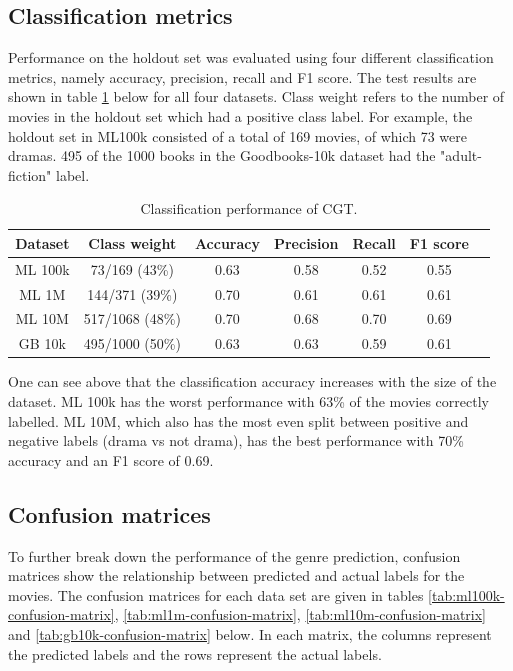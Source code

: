 \subsection{Classification metrics}
Performance on the holdout set was evaluated using four different classification metrics, namely accuracy, precision, recall and F1 score. The test results are shown in table \ref{tab:ml-test-results} below for all four datasets. Class weight refers to the number of movies in the holdout set which had a positive class label. For example, the holdout set in ML100k consisted of a total of 169 movies, of which 73 were dramas. 495 of the 1000 books in the Goodbooks-10k dataset had the "adult-fiction" label.

\begin{table}[H]
\centering
\begin{tabular}{c | c | c | c | c | c | c}
\toprule
\textbf{Dataset} & \textbf{Class weight} & \textbf{Accuracy} & \textbf{Precision} & \textbf{Recall} & \textbf{F1 score} \\
\midrule
ML 100k & 73/169 (43\%) & 0.63 & 0.58 & 0.52 & 0.55 \\
\midrule
ML 1M & 144/371 (39\%) & 0.70 & 0.61 & 0.61 & 0.61 \\
\midrule
ML 10M & 517/1068 (48\%) & 0.70 & 0.68 & 0.70 & 0.69 \\
\midrule
GB 10k & 495/1000 (50\%) & 0.63 & 0.63 & 0.59 & 0.61 \\
\bottomrule
\end{tabular}
\caption[Holdout classification report]{Classification performance of CGT.}
\label{tab:ml-test-results}
\end{table}

One can see above that the classification accuracy increases with the size of the dataset. ML 100k has the worst performance with 63\% of the movies correctly labelled. ML 10M, which also has the most even split between positive and negative labels (drama vs not drama), has the best performance with 70\% accuracy and an F1 score of 0.69.

\subsection{Confusion matrices}
To further break down the performance of the genre prediction, confusion matrices show the relationship between predicted and actual labels for the movies. The confusion matrices for each data set are given in tables \ref{tab:ml100k-confusion-matrix}, \ref{tab:ml1m-confusion-matrix}, \ref{tab:ml10m-confusion-matrix} and \ref{tab:gb10k-confusion-matrix} below. In each matrix, the columns represent the predicted labels and the rows represent the actual labels.

